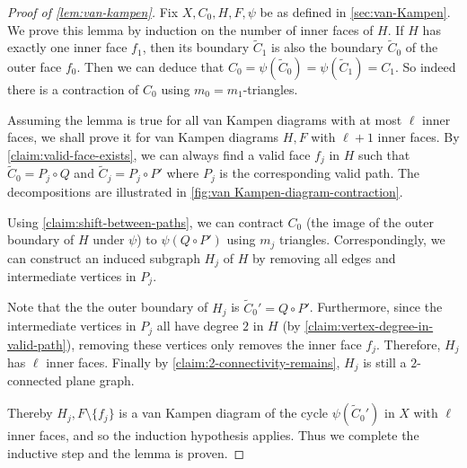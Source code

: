 \documentclass[10pt,a4paper]{article}
\newcommand{\prettyref}[1]{\cref{#1}}
\theoremstyle{definition}
\theoremstyle{remark}
\newcommand{\set}[1]{\{#1\}}
\numberwithin{equation}{section}
\let\pref=\prettyref
\begin{document}
\begin{proof}[Proof of \pref{lem:van-kampen}]
    Fix \(X,C_0,H,F,\psi\) be as defined in \pref{sec:van-Kampen}. We prove this lemma by induction on the number of inner faces of $H$. If $H$ has exactly one inner face \(f_1\), then its boundary $\tilde{C}_1$ is also the boundary $\tilde{C}_0$ of the outer face \(f_0\). Then we can deduce that $C_0 = \psi(\tilde{C}_0) = \psi(\tilde{C}_1) = C_1$. So indeed there is a contraction of \(C_0\) using \(m_{0}=m_1\)-triangles.
    
    Assuming the lemma is true for all van Kampen diagrams with at most \(\ell\) inner faces, we shall prove it for van Kampen diagrams $H,F$ with \(\ell+1\) inner faces.
    By \pref{claim:valid-face-exists}, we can always find a valid face \(f_j\) in $H$ such that \(\tilde{C}_0 = P_j \circ Q\) and \(\tilde{C}_j = P_j \circ P'\) where \(P_j\) is the corresponding valid path. The decompositions are illustrated in \pref{fig:van Kampen-diagram-contraction}.
    
    
    Using \pref{claim:shift-between-paths}, we can contract \(C_0\) (the image of the outer boundary of $H$ under $\psi$) to \(\psi(Q \circ P')\) using \(m_{j}\) triangles. Correspondingly, we can construct an induced subgraph $H_j$ of $H$ by removing all edges and intermediate vertices in \(P_j\). 
    
    Note that the the outer boundary of $H_j$ is $\tilde{C}_0'=Q \circ P'$.
    Furthermore, since the intermediate vertices in $P_j$ all have degree $2$ in $H$ (by \pref{claim:vertex-degree-in-valid-path}), removing these vertices only removes the inner face $f_j$. Therefore, $H_j$ has $\ell$ inner faces.
    Finally by \pref{claim:2-connectivity-remains}, $H_j$ is still a $2$-connected plane graph. 

    Thereby $H_j, F\setminus\set{f_j}$ is a van Kampen diagram of the cycle $\psi(\tilde{C}_0')$ in $X$ with $\ell$ inner faces, and so the induction hypothesis applies.
    Thus we complete the inductive step and the lemma is proven.       
\end{proof}


\end{document}
